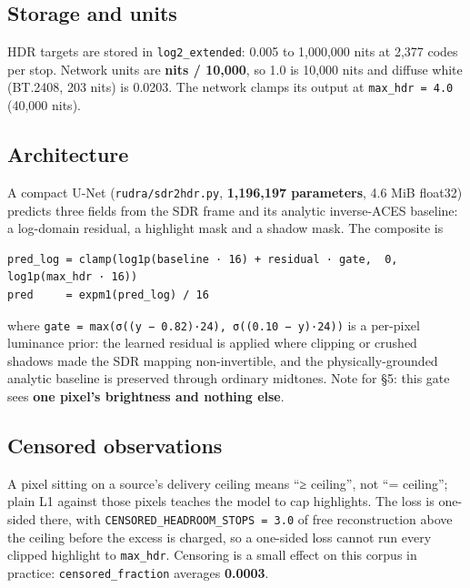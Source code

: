 \hypertarget{storage-and-units}{%
\subsection{Storage and units}\label{storage-and-units}}

HDR targets are stored in \texttt{log2\_extended}: 0.005 to 1,000,000 nits at 2,377
codes per stop. Network units are \textbf{nits / 10,000}, so 1.0 is 10,000 nits and
diffuse white (BT.2408, 203 nits) is 0.0203. The network clamps its output at
\texttt{max\_hdr\ =\ 4.0} (40,000 nits).

\hypertarget{architecture}{%
\subsection{Architecture}\label{architecture}}

A compact U-Net (\texttt{rudra/sdr2hdr.py}, \textbf{1,196,197 parameters}, 4.6 MiB float32)
predicts three fields from the SDR frame and its analytic inverse-ACES baseline:
a log-domain residual, a highlight mask and a shadow mask. The composite is

\begin{verbatim}
pred_log = clamp(log1p(baseline · 16) + residual · gate,  0,  log1p(max_hdr · 16))
pred     = expm1(pred_log) / 16
\end{verbatim}

where \texttt{gate\ =\ max(σ((y\ −\ 0.82)·24),\ σ((0.10\ −\ y)·24))} is a per-pixel luminance
prior: the learned residual is applied where clipping or crushed shadows made
the SDR mapping non-invertible, and the physically-grounded analytic baseline is
preserved through ordinary midtones. Note for §5: this gate sees \textbf{one pixel's
brightness and nothing else}.

\hypertarget{censored-observations}{%
\subsection{Censored observations}\label{censored-observations}}

A pixel sitting on a source's delivery ceiling means ``≥ ceiling'', not
``= ceiling''; plain L1 against those pixels teaches the model to cap highlights.
The loss is one-sided there, with \texttt{CENSORED\_HEADROOM\_STOPS\ =\ 3.0} of free
reconstruction above the ceiling before the excess is charged, so a one-sided
loss cannot run every clipped highlight to \texttt{max\_hdr}. Censoring is a small
effect on this corpus in practice: \texttt{censored\_fraction} averages \textbf{0.0003}.

